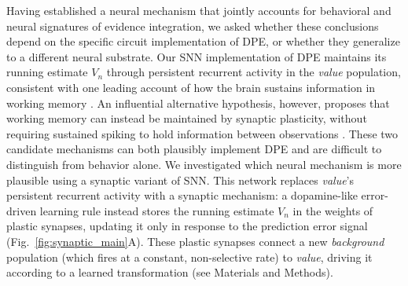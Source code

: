 \begin{ms}
Having established a neural mechanism that jointly accounts for behavioral and neural signatures of evidence integration, we asked whether these conclusions depend on the specific circuit implementation of DPE, or whether they generalize to a different neural substrate. Our SNN implementation of DPE maintains its running estimate $V_n$ through persistent recurrent activity in the \textit{value} population, consistent with one leading account of how the brain sustains information in working memory \citep{wang2002probabilistic, wang2008decision}. An influential alternative hypothesis, however, proposes that working memory can instead be maintained by synaptic plasticity, without requiring sustained spiking to hold information between observations \citep{mongillo2008synaptic, stokes2015activity}. These two candidate mechanisms can both plausibly implement DPE and are difficult to distinguish from behavior alone. We investigated which neural mechanism is more plausible using a synaptic variant of SNN. This network replaces \textit{value}'s persistent recurrent activity with a synaptic mechanism: a dopamine-like error-driven learning rule instead stores the running estimate $V_n$ in the weights of plastic synapses, updating it only in response to the prediction error signal (Fig.~\ref{fig:synaptic_main}A). These plastic synapses connect a new \textit{background} population (which fires at a constant, non-selective rate) to \textit{value}, driving it according to a learned transformation (see Materials and Methods).


\end{ms}
